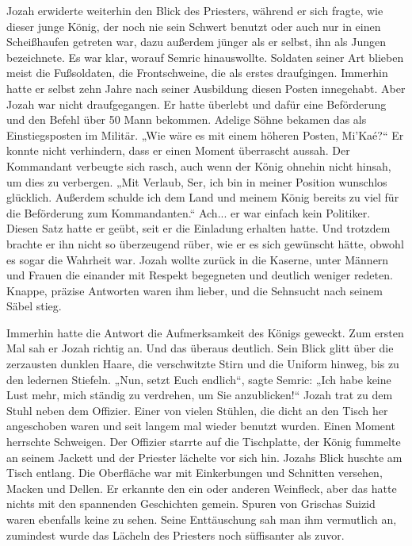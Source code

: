 Jozah erwiderte weiterhin den Blick des Priesters, während er sich fragte, wie dieser junge König, 
der noch nie sein Schwert benutzt oder auch nur in einen Scheißhaufen getreten war, dazu außerdem 
jünger als er selbst, ihn als Jungen bezeichnete. Es war klar, worauf Semric hinauswollte. Soldaten 
seiner Art blieben meist die Fußsoldaten, die Frontschweine, die als erstes draufgingen. Immerhin 
hatte er selbst zehn Jahre nach seiner Ausbildung diesen Posten innegehabt. Aber Jozah war nicht 
draufgegangen. Er hatte überlebt und dafür eine Beförderung und den Befehl über 50 Mann bekommen. 
Adelige Söhne bekamen das als Einstiegsposten im Militär.
„Wie wäre es mit einem höheren Posten, Mi'Kaé?“
Er konnte nicht verhindern, dass er einen Moment überrascht aussah. Der Kommandant verbeugte sich 
rasch, auch wenn der König ohnehin nicht hinsah, um dies zu verbergen.
„Mit Verlaub, Ser, ich bin in meiner Position wunschlos glücklich. Außerdem schulde ich dem Land und 
meinem König bereits zu viel für die Beförderung zum Kommandanten.“
Ach... er war einfach kein Politiker. Diesen Satz hatte er geübt, seit er die Einladung erhalten 
hatte. Und trotzdem brachte er ihn nicht so überzeugend rüber, wie er es sich gewünscht hätte, 
obwohl es sogar die Wahrheit war. Jozah wollte zurück in die Kaserne, unter Männern und Frauen die 
einander mit Respekt begegneten und deutlich weniger redeten. Knappe, präzise Antworten waren ihm 
lieber, und die Sehnsucht nach seinem Säbel stieg.

Immerhin hatte die Antwort die Aufmerksamkeit des Königs geweckt. Zum ersten Mal sah er Jozah 
richtig an. Und das überaus deutlich. Sein Blick glitt über die zerzausten dunklen Haare, die 
verschwitzte Stirn und die Uniform hinweg, bis zu den ledernen Stiefeln. 
„Nun, setzt Euch endlich“, sagte Semric: „Ich habe keine Lust mehr, mich ständig zu verdrehen, um 
Sie anzublicken!“
Jozah trat zu dem Stuhl neben dem Offizier. Einer von vielen Stühlen, die dicht an den Tisch her 
angeschoben waren und seit langem mal wieder benutzt wurden. 
Einen Moment herrschte Schweigen. Der Offizier starrte auf die Tischplatte, der König fummelte an 
seinem Jackett und der Priester lächelte vor sich hin. Jozahs Blick huschte am Tisch entlang. Die 
Oberfläche war mit Einkerbungen und Schnitten versehen, Macken und Dellen. Er erkannte den ein oder 
anderen Weinfleck, aber das hatte nichts mit den spannenden Geschichten gemein. Spuren von Grischas 
Suizid waren ebenfalls keine zu sehen. Seine Enttäuschung sah man ihm vermutlich an, zumindest wurde 
das Lächeln des Priesters noch süffisanter als zuvor.

